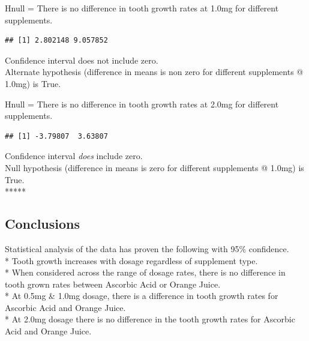 \documentclass[]{article}
\newenvironment{Shaded}{\begin{snugshade}}{\end{snugshade}}
\newcommand{\KeywordTok}[1]{\textcolor[rgb]{0.13,0.29,0.53}{\textbf{{#1}}}}
\newcommand{\DecValTok}[1]{\textcolor[rgb]{0.00,0.00,0.81}{{#1}}}
\newcommand{\FloatTok}[1]{\textcolor[rgb]{0.00,0.00,0.81}{{#1}}}
\newcommand{\StringTok}[1]{\textcolor[rgb]{0.31,0.60,0.02}{{#1}}}
\newcommand{\NormalTok}[1]{{#1}}
\begin{document}
Hnull = There is no difference in tooth growth rates at 1.0mg for
different supplements.

\begin{Shaded}
\end{Shaded}

\begin{verbatim}
## [1] 2.802148 9.057852
\end{verbatim}

Confidence interval does not include zero.\\Alternate hypothesis
(difference in means is non zero for different supplements @ 1.0mg) is
True.

Hnull = There is no difference in tooth growth rates at 2.0mg for
different supplements.

\begin{Shaded}
\end{Shaded}

\begin{verbatim}
## [1] -3.79807  3.63807
\end{verbatim}

Confidence interval \emph{does} include zero.\\Null hypothesis
(difference in means is zero for different supplements @ 1.0mg) is
True.\\*****

\subsection{Conclusions}\label{conclusions}

Statistical analysis of the data has proven the following with 95\%
confidence.\\* Tooth growth increases with dosage regardless of
supplement type.\\* When considered across the range of dosage rates,
there is no difference in tooth grown rates between Ascorbic Acid or
Orange Juice.\\* At 0.5mg \& 1.0mg dosage, there is a difference in
tooth growth rates for Ascorbic Acid and Orange Juice.\\* At 2.0mg
dosage there is no difference in the tooth growth rates for Ascorbic
Acid and Orange Juice.
\end{document}
